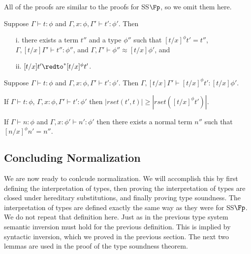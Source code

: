 All of the proofs are similar to the proofs for SS$\Fp$, so we omit
them here.
\begin{lemma}
  \label{lemma:total_ssfe}
  Suppose $\Gamma \vdash t : \phi$ and $\Gamma, x:\phi, \Gamma' \vdash t':\phi'$.  Then
  \begin{itemize}
  \item[i.] there exists a term $t''$ and a type $\phi''$ such that $[t/x]^\phi t' = t''$, 
    $\Gamma,[t/x]\Gamma' \vdash t'':\phi''$, and $\Gamma,\Gamma' \vdash \phi'' \approx [t/x]\phi'$, and
  \item[ii.] $[t/x]t' \redto^* [t/x]^\phi t'$.
  \end{itemize}
\end{lemma}

\begin{corollary}[]
  \label{corollary:type_preserving_ssfe}
  Suppose $\Gamma \vdash t : \phi$ and $\Gamma, x:\phi, \Gamma' \vdash t':\phi'$. Then
  $\Gamma,[t/x]\Gamma' \vdash [t/x]^\phi t':[t/x]\phi'$.
\end{corollary}

\begin{lemma}
  \label{lemma:redex_preserving_ssfe}
  If $\Gamma \vdash t : \phi$, $\Gamma, x:\phi, \Gamma' \vdash t':\phi'$
  then  $|rset(t', t)| \geq |rset([t/x]^\phi t')|$.
\end{lemma}

\begin{lemma}
  \label{corollary:normalization_preserving_ssfe}
  If $\Gamma \vdash n:\phi$ and $\Gamma, x:\phi' \vdash n':\phi'$ then there exists a normal term $n''$ 
  such that $[n/x]^\phi n' = n''$.
\end{lemma}

\subsection{Concluding Normalization}
\label{subsec:concluding_normalization_ssfe}
We are now ready to conlcude normalization.  We will accomplish this
by first defining the interpretation of types, then proving the
interpretation of types are closed under hereditary substitutions, and
finally proving type soundness.  The interpretation of types are
defined exactly the same way as they were for SS$\Fp$.  We do not
repeat that definition here.  Just as in the previous type system
semantic inversion must hold for the previous definition.  This is
implied by syntactic inversion, which we proved in the previous
section.  The next two lemmas are used in the proof of the type
soundness theorem.

